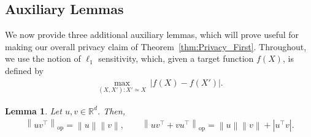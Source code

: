 \documentclass[11pt]{article}
\newtheorem{lem}{Lemma}
\theoremstyle{definition}
\theoremstyle{plain}
\providecommand{\theoremref}[1]{Theorem~\ref{#1}}
\newcommand{\reals}{\mathbb{R}}
\newcommand{\abs}[1]{\left| #1 \right|}
\newcommand{\Norm}[1]{\left\| #1 \right\|}
\providecommand{\norm}[1]{\Norm{#1}}
\begin{document}
\bigskip 
\subsection{Auxiliary Lemmas}
We now provide three additional auxiliary lemmas, which will prove useful for making our overall privacy claim of \theoremref{thm:Privacy_First}. Throughout, we use the notion of $\ell_1$ sensitivity, which, given a target function $f(X)$, is defined by
\begin{align}
    \underset{(X,X'): X'\simeq X}{\max} \ \abs{f(X) - f(X')}.    
\end{align}

\begin{lem}
    \label{lem:operator_norms}
    Let $u,v\in\reals^{d}$. Then,
    \begin{align}
        \norm{uv^{\top}}_{\mathrm{op}} = \norm{u}\norm{v},
        \qquad
        \norm{uv^{\top} + vu^{\top}}_{\mathrm{op}}
        = \norm{u}\norm{v} + \abs{u^{\top}v}.
    \end{align}
\end{lem}
\end{document}
